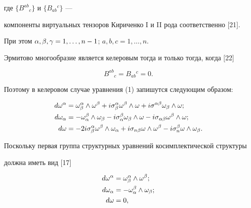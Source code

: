 \begin{pf}
где $\{B^{ab}{}_c\}$ и $\{B_{ab}{}^c\}$ --- 


компоненты виртуальных тензоров Кириченко I и II рода соответственно [21].


При этом  $\alpha,\beta,\gamma=1,\ldots,n-1$; $a,b,c=1,\dotsc,n$.


Эрмитово многообразие является келеровым тогда и только тогда, когда [22]


$$


B^{ab}{}_c= B_{ab}{}^c=0.


$$


Поэтому в келеровом случае уравнения (1) запишутся следующим образом:


\begin{align*}


d\omega^\al&=\omega^{\al}_{\beta} \land \omega^{\beta} + 


i \sigma^\al_{\beta}\omega^\beta \land \omega + i \sigma^{\al\beta}


\omega_{\beta} \land \omega ;\\


d\omega_{\al}&=-\omega^\beta_{\al} \land \omega_{\beta}


- i \sigma_{\al}^{\beta}\omega_{\beta} \land \omega - i \sigma_{\al\beta}


\omega^{\beta} \land \omega; \\


d\omega&= - 2 i\sigma^\al_{\beta}\omega^{\beta}\land \omega_{\al}


+ i \sigma_{n\beta}\omega \land \omega^{\beta} - i \sigma^\beta_n


\omega \land \omega_{\beta}.


\end{align*}





Поскольку первая группа структурных уравнений косимплектической структуры


должна иметь вид [17]


\begin{align*}


d\omega^\al &= \omega^\al_\beta \land \omega^\beta;\\


d\omega_\al&=- \omega^\beta_\al \land \omega_\beta;\\


d\omega&=0,


\end{align*}



\end{pf}
